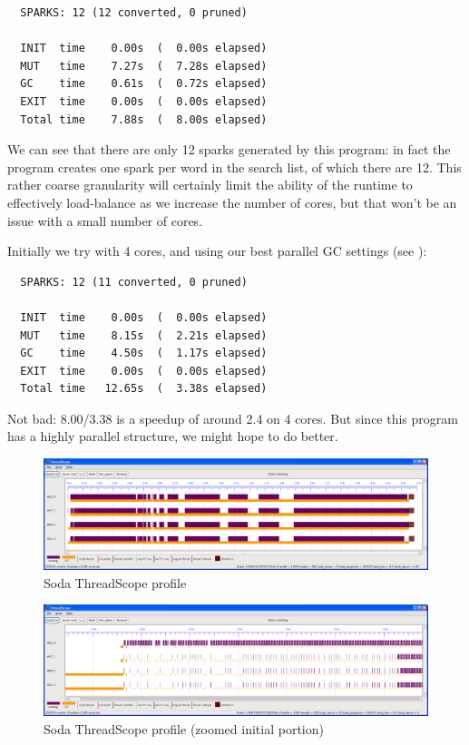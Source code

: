\documentclass[twocolumn,9pt]{sigplanconf}
\let\cite=\citep
\begin{document}
\begin{verbatim}
  SPARKS: 12 (12 converted, 0 pruned)

  INIT  time    0.00s  (  0.00s elapsed)
  MUT   time    7.27s  (  7.28s elapsed)
  GC    time    0.61s  (  0.72s elapsed)
  EXIT  time    0.00s  (  0.00s elapsed)
  Total time    7.88s  (  8.00s elapsed)
\end{verbatim}

We can see that there are only 12 sparks generated by this program: in
fact the program creates one spark per word in the search list, of
which there are 12.  This rather coarse granularity will certainly
limit the ability of the runtime to effectively load-balance as we
increase the number of cores, but that won't be an issue with a small
number of cores.

Initially we try with 4 cores, and using our best parallel GC settings
(see \cite{multicore-ghc}):

\begin{verbatim}
  SPARKS: 12 (11 converted, 0 pruned)

  INIT  time    0.00s  (  0.00s elapsed)
  MUT   time    8.15s  (  2.21s elapsed)
  GC    time    4.50s  (  1.17s elapsed)
  EXIT  time    0.00s  (  0.00s elapsed)
  Total time   12.65s  (  3.38s elapsed)
\end{verbatim}

Not bad: 8.00/3.38 is a speedup of around 2.4 on 4 cores.  But since
this program has a highly parallel structure, we might hope to do
better.  

\begin{figure}
\begin{center}
\includegraphics[scale=0.3]{soda1.png}
\end{center}
\caption{Soda ThreadScope profile}
\label{f:soda-threadscope}
\end{figure}

\begin{figure}
\begin{center}
\includegraphics[scale=0.3]{soda2.png}
\end{center}
\caption{Soda ThreadScope profile (zoomed initial portion)}
\label{f:soda-threadscope2}
\end{figure}
\end{document}
